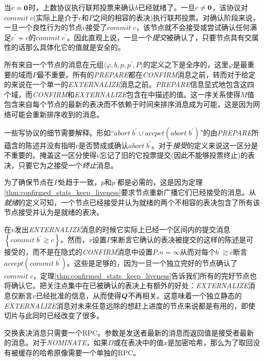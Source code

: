 当$c={\bm 0}$时，上数协议执行联邦投票来确认$b$已经就绪了。一旦$c\neq {\bm 0}$，该协议对$commit\;c$(实际上是介于$c$和$P$之间的相容的表决)执行联邦投票。对确认阶段来说，一旦一个良性行为的节点$v$接受了$commit\;c$，该节点就不会接受或尝试确认任何满足$c^{\prime}\not\sim c$的$commit\;c^{\prime}$。因此直观上说，一旦一个\textit{提交}被确认了，只要节点具有{\quorum}交属性的话那么具体化它的值就是安全的。

所有来自一个节点的消息在元组$\langle \varphi,b,p,p^{\prime},P\rangle$的定义之下是全序的，这里$\varphi$是最重要的域而$P$最不重要。所有的\textsl{PREPARE}都在\textsl{CONFIRM}消息之前，转而对于给定的{\slot}来说在一个单一的\textsl{EXTERNALIZE}消息之前。\textsl{PREPARE}信息显式地包含这四个域，而\textsl{CONFIRM}和\textsl{EXTERNALIZE}包含在中描述的值。这一序关系使得$M$值包含来自每个节点的最新的表决而不依赖于时间来排序消息成为可能，这是因为网络可能会重新排序收到的消息。

一些写协议的细节需要解释。形如``$abort\;b^{\prime}\cup accpet(abort\;b^{\prime})$''的由\textsl{PREPARE}所蕴含的陈述并没有指明$v$是否赞成或确认$abort\;b^{\prime}$。对于\textit{接受}的定义来说这一区分是不重要的。掩盖这一区分使得$v$忘记了旧的它投票提交(因此不能够投票终止)的表决，只要它为之接受一个\textit{终止}消息。

为了确保节点在$P$处趋于一致，$p$和$p^{\prime}$都是必需的，这是因为定理\ref{thm:confirmed_stats_keep_liveness}要求节点重新广播它们已经接受的消息。从\textit{就绪}的定义可知，一个节点已经接受并认为就绪的两个不相容的表决包含了所有该节点接受并认为是就绪的表决。

在$v$发出\textsl{ENTERNALIZE}消息的时候它实际上已经一个区间内的提交消息$\left\{commit \; b^{\prime}\gtrsim c\right\}$。然而，$v$设置$P$来断言它确认的表决被提交的这样的陈述是可接受的，而不是在隐式的\textsl{CONFIRM}消息中设置$P.n=\infty$从而对每个$b^{\prime}\gtrsim c$断言$accept(commit\;b^{\prime})$。这些是足够的，因为一旦一个独立完好的节点确认了$commit\;c$，定理\ref{thm:confirmed_stats_keep_liveness}告诉我们所有的完好节点也将确认它。把关注点集中在已被确认的表决上有额外的好处：\textsl{EXTERNALIZE}消息仅断言$v$已经批准的信息，从而使得${\bm Q}$不再相关。这意味着一个独立静态的\textsl{EXTERNALIZE}消息对未来任意远除的想赶上进度的节点来说都是有用的，即使{\quorum}切片与此同时已经改变了很多。

交换表决消息只需要一个RPC。参数是发送者最新的消息而返回值是接受者最新的消息。对于\textsl{NOMINATE}，如果$D$或在表决中的值$x$是加密哈希，那么为了取回没有被缓存的哈希原像需要一个单独的RPC。